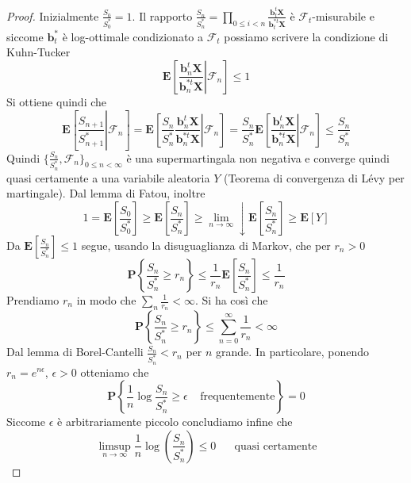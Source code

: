\documentclass[a4paper,11pt]{book}
\theoremstyle{plain}
\theoremstyle{definition}
\theoremstyle{remark}
\newcommand{\X}{\bm{X}}
\newcommand{\B}{\bm{b}}
\newcommand{\F}{\mathcal{F}}
\newcommand{\Pro}{\mathbf{P}}
\newcommand{\E}{\mathbf{E}}
\begin{document}
\begin{proof}
		Inizialmente $\frac{S_0}{S_0^*}=1$. Il rapporto $\frac{S_n}{S_n^*}=\prod_{0\leq i <n}{\frac{\B_t^t\X}{\B_t^{*t}\X}}$ è $\F_t$-misurabile e siccome $\B_t^*$ è log-ottimale condizionato a $\F_t$ possiamo scrivere la condizione di Kuhn-Tucker
	\begin{equation}
		\E\left[\left.\frac{\B_n^t\X}{\B_n^{*t}\X}\right| \F_n\right]\leq 1
	\end{equation}
	Si ottiene quindi che
	\begin{equation*}
		\E\left[\left.\frac{S_{n+1}}{S^*_{n+1}}\right| \F_n\right]=\E\left[\left.\frac{S_n}{S_n^*}\frac{\B_n^t\X}{\B_n^{*t}\X}\right| \F_n\right] = \frac{S_n}{S_n^*}\E\left[\left.\frac{\B_n^t\X}{\B_n^{*t}\X}\right| \F_n\right]\leq \frac{S_n}{S_n^*}
	\end{equation*}
	Quindi $\{\frac{S_n}{S^*_n}, \F_n\}_{0\leq n <\infty}$ è una supermartingala non negativa e converge quindi quasi certamente a una variabile aleatoria $Y$ (Teorema di convergenza di Lévy per martingale). Dal lemma di Fatou, inoltre
	\begin{equation*}
		1 = \E\left[\frac{S_0}{S_0^*}\right]\geq \E\left[\frac{S_n}{S_n^*}\right] \geq \lim\limits_{n\to\infty}\downarrow \E\left[\frac{S_n}{S_n^*}\right] \geq \E[Y]
	\end{equation*}
	Da $\E\left[\frac{S_n}{S_n^*}\right]\leq 1$ segue, usando la disuguaglianza di Markov, che per $r_n>0$
	\begin{equation*}
		\Pro\left\{\frac{S_n}{S_n^*}\geq r_n\right\} \leq \frac{1}{r_n}\E\left[\frac{S_n}{S_n^*}\right]\leq \frac{1}{r_n}
	\end{equation*}
	Prendiamo $r_n$ in modo che $\sum_n\frac{1}{r_n}<\infty$. Si ha così che
	\begin{equation*}
		\Pro\left\{\frac{S_n}{S_n^*}\geq r_n\right\} \leq \sum_{n=0}^\infty{\frac{1}{r_n}}<\infty
	\end{equation*}
	Dal lemma di Borel-Cantelli $\frac{S_n}{S_n^*}<r_n$ per $n$ grande. In particolare, ponendo $r_n = e^{n\epsilon}$, $\epsilon>0$ otteniamo che
	\begin{equation*}
		\Pro\left\{\frac{1}{n}\log\frac{S_n}{S_n^*}\geq \epsilon \;\;\;\;\text{frequentemente}\right\}= 0
	\end{equation*}
	Siccome $\epsilon$ è arbitrariamente piccolo concludiamo infine che
	\begin{equation*}
		\limsup\limits_{n\to\infty}\frac{1}{n}\log\left(\frac{S_n}{S_n^*}\right)\leq 0 \;\;\;\;\;\; \text{quasi certamente}
	\end{equation*}
\end{proof}
\end{document}
